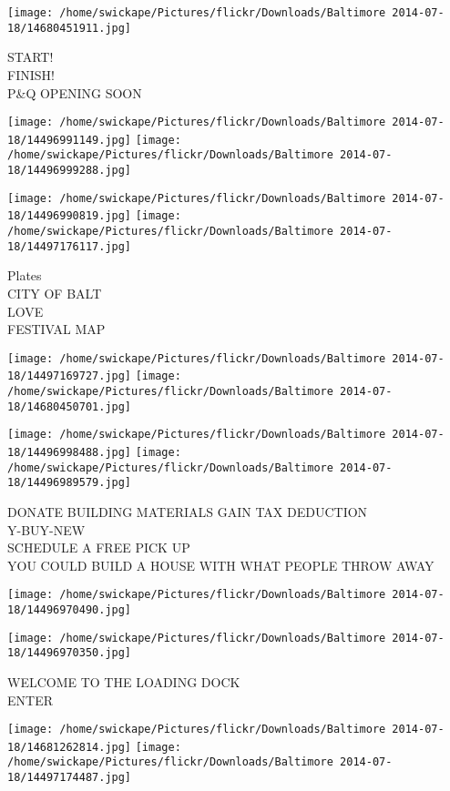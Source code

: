 \documentclass[10pt,letterpaper]{article}
\begin{document}
\vspace{0.25in}
\texttt{[image: /home/swickape/Pictures/flickr/Downloads/Baltimore 2014-07-18/14680451911.jpg]}

START!\\
FINISH!\\
P\&Q OPENING SOON
\pagebreak

\texttt{[image: /home/swickape/Pictures/flickr/Downloads/Baltimore 2014-07-18/14496991149.jpg]}
\texttt{[image: /home/swickape/Pictures/flickr/Downloads/Baltimore 2014-07-18/14496999288.jpg]}

\texttt{[image: /home/swickape/Pictures/flickr/Downloads/Baltimore 2014-07-18/14496990819.jpg]}
\texttt{[image: /home/swickape/Pictures/flickr/Downloads/Baltimore 2014-07-18/14497176117.jpg]}

Plates\\
CITY OF BALT\\
LOVE\\
FESTIVAL MAP
\pagebreak

\texttt{[image: /home/swickape/Pictures/flickr/Downloads/Baltimore 2014-07-18/14497169727.jpg]}
\texttt{[image: /home/swickape/Pictures/flickr/Downloads/Baltimore 2014-07-18/14680450701.jpg]}

\texttt{[image: /home/swickape/Pictures/flickr/Downloads/Baltimore 2014-07-18/14496998488.jpg]}
\texttt{[image: /home/swickape/Pictures/flickr/Downloads/Baltimore 2014-07-18/14496989579.jpg]}

DONATE BUILDING MATERIALS GAIN TAX DEDUCTION\\
Y{-}BUY{-}NEW\\
SCHEDULE A FREE PICK UP\\
YOU COULD BUILD A HOUSE WITH WHAT PEOPLE THROW AWAY
\pagebreak

\texttt{[image: /home/swickape/Pictures/flickr/Downloads/Baltimore 2014-07-18/14496970490.jpg]}

\vspace{0.25in}
\texttt{[image: /home/swickape/Pictures/flickr/Downloads/Baltimore 2014-07-18/14496970350.jpg]}

WELCOME TO THE LOADING DOCK\\
ENTER
\pagebreak

\texttt{[image: /home/swickape/Pictures/flickr/Downloads/Baltimore 2014-07-18/14681262814.jpg]}
\texttt{[image: /home/swickape/Pictures/flickr/Downloads/Baltimore 2014-07-18/14497174487.jpg]}
\end{document}
